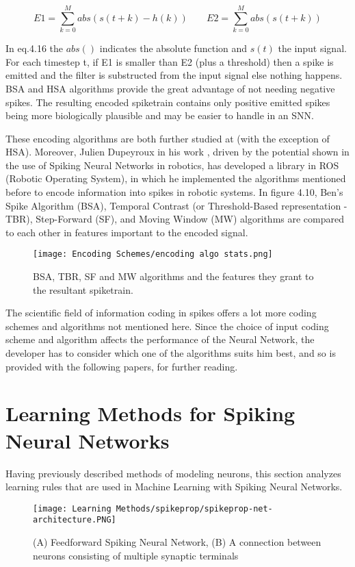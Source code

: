 \documentclass[12pt]{report}
\begin{document}
\begin{equation}
    E1=\sum_{k=0}^{M}abs(s(t+k)-h(k)) \;\;\;\;\;\;\;
    E2=\sum_{k=0}^{M}abs(s(t+k))
\end{equation}

In eq.4.16 the \(abs()\) indicates the absolute function and \(s(t)\) the input signal. For each timestep t, if E1 is smaller than E2 (plus a threshold) then a spike is emitted and the filter is substructed from the input signal else nothing happens. BSA and HSA algorithms provide the great advantage of not needing negative spikes. The resulting encoded spiketrain contains only positive emitted spikes being more biologically plausible and may be easier to handle in an SNN.

These encoding algorithms are both further studied at \cite{Petro2020} (with the exception of HSA). Moreover, Julien Dupeyroux in his work \cite{Dupeyroux2021}, driven by the potential shown in the use of Spiking Neural Networks in robotics, has developed a library in ROS (Robotic Operating System), in which he implemented the algorithms mentioned before to encode information into spikes in robotic systems. In figure 4.10, Ben's Spike Algorithm (BSA), Temporal Contrast (or Threshold-Based representation - TBR), Step-Forward (SF), and Moving Window (MW) algorithms are compared to each other in features important to the encoded signal.

\begin{figure}[htp]
    \centering
    \texttt{[image: Encoding Schemes/encoding algo stats.png]}
    \caption{BSA, TBR, SF and MW algorithms and the features they grant to the resultant spiketrain.}
    \label{fig:spikeprop-net-architecture}
\end{figure}

The scientific field of information coding in spikes offers a lot more coding schemes and algorithms not mentioned here. Since the choice of input coding scheme and algorithm affects the performance of the Neural Network, the developer has to consider which one of the algorithms suits him best, and so is provided with the following papers\cite{Guo2021}, \cite{Schuman2019} for further reading.

\chapter{Learning Methods for Spiking Neural Networks}
Having previously described methods of modeling neurons, this section analyzes learning rules that are used in Machine Learning with Spiking Neural Networks.
\begin{figure}[htp]
    \centering
    \texttt{[image: Learning Methods/spikeprop/spikeprop-net-architecture.PNG]}
    \caption{(A) Feedforward Spiking Neural Network, (B) A connection between neurons consisting of multiple synaptic terminals}
    \label{fig:spikeprop-net-architecture}
\end{figure}
\end{document}
